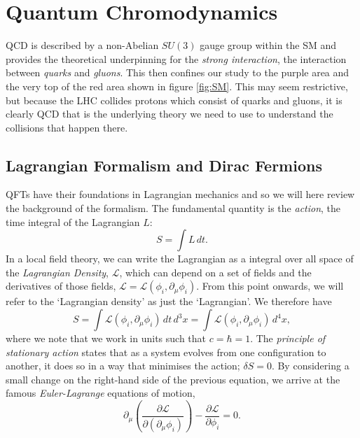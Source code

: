 \section{Quantum Chromodynamics}

QCD is described by a non-Abelian $SU(3)$ gauge group within the SM and provides the theoretical underpinning for the \emph{strong interaction}, the interaction between \emph{quarks} and \emph{gluons}. This then confines our study to the purple area and the very top of the red area shown in figure \ref{fig:SM}. This may seem restrictive, but because the LHC collides protons which consist of quarks and gluons, it is clearly QCD that is the underlying theory we need to use to understand the collisions that happen there. 

\subsection{Lagrangian Formalism and Dirac Fermions}
QFTs have their foundations in Lagrangian mechanics and so we will here review the background of the formalism. The fundamental quantity is the \emph{action}, the time integral of the Lagrangian $L$:
\begin{equation}
S = \int L \hspace{2pt} dt.
\end{equation}
In a local field theory, we can write the Lagrangian as a integral over all space of the \emph{Lagrangian Density}, $\mathscr{L}$, which can depend on a set of fields and the derivatives of those fields, $\mathscr{L} = \mathscr{L}(\phi_i, \partial_\mu \phi_i)$. From this point onwards, we will refer to the `Lagrangian density' as just the `Lagrangian'. We therefore have
\begin{equation}
S = \int \mathscr{L} (\phi_i, \partial_\mu \phi_i) \hspace{2pt} dt \hspace{2pt} d^3 x = \int \mathscr{L} (\phi_i, \partial_\mu \phi_i) \hspace{2pt} d^4 x,
\end{equation}
where we note that we work in units such that $c = \hbar = 1$. The \emph{principle of stationary action} states that as a system evolves from one configuration to another, it does so in a way that minimises the action; $\delta S = 0$. By considering a small change on the right-hand side of the previous equation, we arrive at the famous \emph{Euler-Lagrange} equations of motion,
\begin{equation}
\label{eqn:el}
\partial_\mu \left( \frac{\partial \mathscr{L}}{\partial (\partial_\mu \phi_i)} \right) - \frac{\partial \mathscr{L}}{\partial \phi_i} = 0.
\end{equation}
